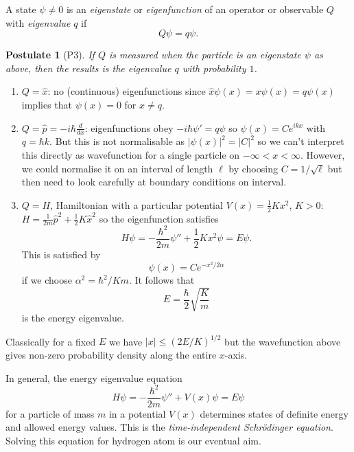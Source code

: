 \documentclass[a4paper]{article}
\newtheorem*{postulate}{Postulate}
\begin{document}
\begin{defi}
  A state \(\psi \neq 0\) is an \emph{eigenstate} or \emph{eigenfunction} of an operator or observable \(Q\) with \emph{eigenvalue} \(q\) if
  \[
Q\psi = q\psi.
  \]
\end{defi}

\begin{postulate}[P3]
  If \(Q\) is measured when the particle is an eigenstate \(\psi\) as above, then the results is the eigenvalue \(q\) with probability $1$.
\end{postulate}

\begin{eg}\leavevmode
  \begin{enumerate}
  \item \(Q=\hat x\): no (continuous) eigenfunctions since \(\hat x \psi (x)= x\psi(x) = q\psi(x)\) implies that \(\psi(x)=0\) for \(x\neq q\).
  \item \(Q=\hat p=-i\hbar \frac{d}{dx}\): eigenfunctions obey \(-i\hbar \psi' = q\psi\) so \(\psi(x) = C e^{ikx}\) with \(q=\hbar k\). But this is not normalisable as \(|\psi(x)|^2 = |C|^2\) so we can't interpret this directly as wavefunction for a single particle on \(-\infty < x < \infty\). However, we could normalise it on an interval of length \(\ell\) by choosing \(C = 1/\sqrt{\ell}\) but then need to look carefully at boundary conditions on interval.
  \item \(Q = H\), Hamiltonian with a particular potential \(V(x) = \frac{1}{2} K x^2\), \(K > 0\): \(H=\frac{1}{2m}\hat p^2 + \frac{1}{2}K\hat x^2\) so the eigenfunction satisfies
    \[
H\psi = -\frac{\hbar^2}{2m} \psi'' + \frac{1}{2}K x^2\psi = E \psi.
    \]
    This is satisfied by
    \[
\psi(x) = C e^{-x^2/2\alpha}
\]
if we choose \(\alpha^2 = \hbar^2/Km\). It follows that
\[
E = \frac{\hbar}{2} \sqrt{\frac{K}{m}}
\]
is the energy eigenvalue.
  \end{enumerate}
\end{eg}

\begin{note}
  Classically for a fixed \(E\) we have \(|x| \leq (2E/K)^{1/2}\) but the wavefunction above gives non-zero probability density along the entire \(x\)-axis.
\end{note}

In general, the energy eigenvalue equation
\[
H\psi = -\frac{\hbar^2}{2m} \psi'' + V(x)\psi = E \psi
\]
for a particle of mass \(m\) in a potential \(V(x)\) determines states of definite energy and allowed energy values. This is the \emph{time-independent Schr\"odinger equation}. Solving this equation for hydrogen atom is our eventual aim.
\end{document}
